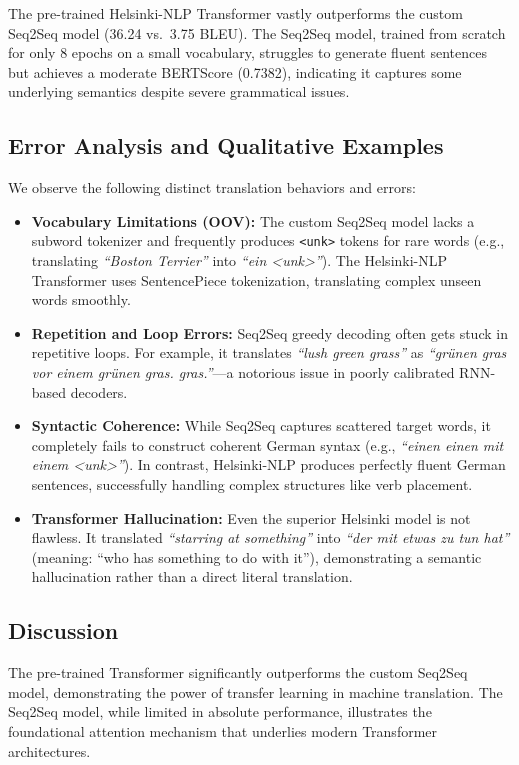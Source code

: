 \documentclass[12pt, a4paper]{article}
\begin{document}
The pre-trained Helsinki-NLP Transformer vastly outperforms the custom Seq2Seq model (36.24 vs.\ 3.75 BLEU). The Seq2Seq model, trained from scratch for only 8 epochs on a small vocabulary, struggles to generate fluent sentences but achieves a moderate BERTScore (0.7382), indicating it captures some underlying semantics despite severe grammatical issues.

\subsection{Error Analysis and Qualitative Examples}

We observe the following distinct translation behaviors and errors:
\begin{itemize}
    \item \textbf{Vocabulary Limitations (OOV):} The custom Seq2Seq model lacks a subword tokenizer and frequently produces \texttt{<unk>} tokens for rare words (e.g., translating \textit{``Boston Terrier''} into \textit{``ein <unk>''}). The Helsinki-NLP Transformer uses SentencePiece tokenization, translating complex unseen words smoothly.
    \item \textbf{Repetition and Loop Errors:} Seq2Seq greedy decoding often gets stuck in repetitive loops. For example, it translates \textit{``lush green grass''} as \textit{``gr\"unen gras vor einem gr\"unen gras. gras.''}---a notorious issue in poorly calibrated RNN-based decoders.
    \item \textbf{Syntactic Coherence:} While Seq2Seq captures scattered target words, it completely fails to construct coherent German syntax (e.g., \textit{``einen einen mit einem <unk>''}). In contrast, Helsinki-NLP produces perfectly fluent German sentences, successfully handling complex structures like verb placement.
    \item \textbf{Transformer Hallucination:} Even the superior Helsinki model is not flawless. It translated \textit{``starring at something''} into \textit{``der mit etwas zu tun hat''} (meaning: ``who has something to do with it''), demonstrating a semantic hallucination rather than a direct literal translation.
\end{itemize}

\subsection{Discussion}

The pre-trained Transformer significantly outperforms the custom Seq2Seq model, demonstrating the power of transfer learning in machine translation. The Seq2Seq model, while limited in absolute performance, illustrates the foundational attention mechanism that underlies modern Transformer architectures.
\end{document}
